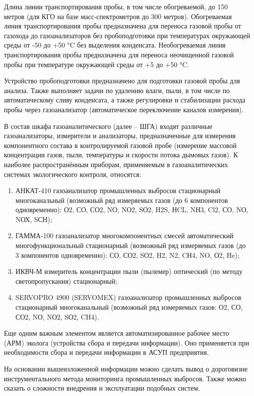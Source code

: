 \documentclass[14pt, a4paper]{extreport}
\begin{document}
	Длина линии транспортирования пробы, в том числе обогреваемой, до 150 метров (для КГО на базе масс-спектрометров до 300 метров). Обогреваемая линия транспортирования пробы предназначена для переноса газовой пробы от газохода до газоанализаторов без пробоподготовки при температурах окружающей среды от -50 до +50 °C без выделения конденсата. Необогреваемая линия транспортирования пробы предназначена для переноса неочищенной газовой пробы при температуре окружающей среды от +5 до +50 °C.
	
	Устройство пробоподготовки предназначено для подготовки газовой пробы для анализа. Также выполняет задачи по удалению влаги, пыли, в том числе по автоматическому сливу конденсата, а также регулировки и стабилизации расхода пробы через газоанализатор (автоматическое переключение каналов измерения).
	
	В состав шкафа газоаналитического (далее -- ШГА) входят различные газоанализаторы, измерители и анализаторы, предназначенные для измерения компонентного состава в контролируемой газовой пробе (измерение массовой концентрации газов, пыли, температуры и скорости потока дымовых газов). К наиболее распространённым приборам, применяемым в газоаналитических системах экологического контроля, относятся:
	\begin{enumerate}[label={\arabic*)}]
		\item АНКАТ-410 газоанализатор промышленных выбросов стационарный многоканальный (возможный ряд измеряемых газов (до 6 компонентов одновременно): О2, СО, СО2, NО, NО2, SО2, H2S, НCL, NН3, Cl2, СО, NО, NОХ, SСН);
		\item ГАММА-100 газоанализатор многокомпонентных смесей автоматический многофункциональный стационарный (возможный ряд измеряемых газов (до 3 компонентов одновременно): СО, СО2, SО2, H2, N2, CН4, NO, О2, He);
		\item ИКВЧ-М измеритель концентрации пыли (пылемер) оптический (по методу светопропускания) стационарный;
		\item SERVOPRO 4900 (SERVOMEX) газоанализатор промышленных выбросов стационарный многоканальный (возможный ряд измеряемых газов: О2, СО, СО2, NО, NО2, SО2, CH4).
	\end{enumerate}
	
	Еще одним важным элементом является автоматизированное рабочее место (АРМ) эколога (устройства сбора и передачи информации). Оно применяется при необходимости сбора и передачи информации в АСУП предприятия.
	
	На основании вышеизложенной информации можно сделать вывод о дороговизне инструментального метода мониторинга промышленных выбросов. Также можно сказать о сложности внедрения и эксплуатации подобных систем.
	
\end{document}
